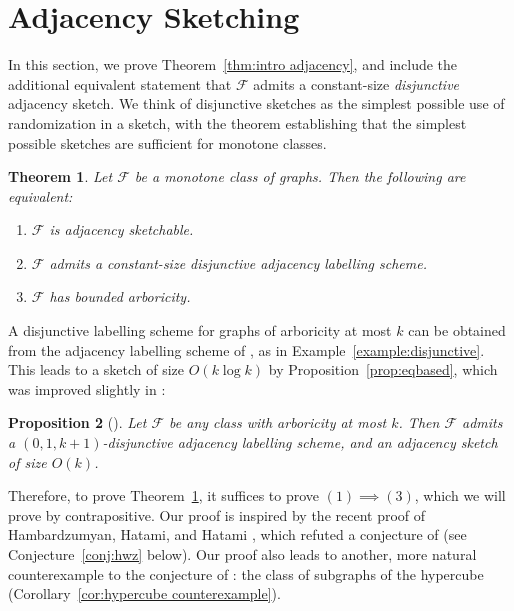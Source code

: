 \documentclass[11pt]{article}
\newtheorem{thm}{Theorem}[section]
\newtheorem{proposition}[thm]{Proposition}
\theoremstyle{definition}
\def\F {{\mathcal F}}
\begin{document}
\section{Adjacency Sketching}
\label{section:adjacency}

In this section, we prove Theorem~\ref{thm:intro adjacency}, and include the additional equivalent
statement that $\F$ admits a constant-size \emph{disjunctive} adjacency sketch. We think of
disjunctive sketches as the simplest possible use of randomization in a sketch, with the theorem
establishing that the simplest possible sketches are sufficient for monotone classes.

\begin{thm}
\label{thm:adjacency sketching}
Let $\F$ be a monotone class of graphs. Then the following are equivalent:
\begin{enumerate}
\item $\F$ is adjacency sketchable.
\item $\F$ admits a constant-size disjunctive adjacency labelling scheme.
\item $\F$ has bounded arboricity.
\end{enumerate}
\end{thm}
\noindent
A disjunctive labelling scheme for graphs of arboricity at most $k$ can be obtained from the adjacency
labelling scheme of \cite{KNR92}, as in Example~\ref{example:disjunctive}. This leads to a sketch of
size $O(k \log k)$ by Proposition~\ref{prop:eqbased}, which was improved slightly in
\cite{HWZ21}:
\begin{proposition}[\cite{HWZ21}]\label{prop:ask}
Let $\F$ be any class with arboricity at most $k$. Then $\F$ admits a $(0,1,k+1)$-disjunctive
adjacency labelling scheme, and an adjacency sketch of size $O(k)$.
\end{proposition}
\noindent
Therefore, to prove Theorem~\ref{thm:adjacency sketching}, it suffices to prove $(1) \implies (3)$,
which we will prove by contrapositive.
Our proof is inspired by the recent proof of Hambardzumyan, Hatami, and
Hatami \cite{HHH21b}, which refuted a conjecture of \cite{HWZ21} (see Conjecture~\ref{conj:hwz}
below). Our proof also leads to another, more natural counterexample to the conjecture of
\cite{HWZ21}: the class of subgraphs of the hypercube (Corollary~\ref{cor:hypercube
counterexample}).
\end{document}
